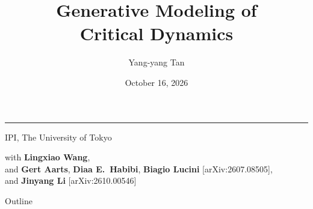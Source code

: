 \documentclass[11pt,t]{beamer}
\title{Generative Modeling of\\ Critical Dynamics}
\subtitle{}
\date{October 16, 2026}
\author{Yang-yang Tan}
\begin{document}
\begin{frame}
  \inserttitlegraphic\par
  \vspace*{0.5cm}
  {\LARGE\bfseries \inserttitle\par}
  \vspace{0.4em}
  {\color{orange}\rule{\textwidth}{0.4pt}\par}
  \vspace{1.4em}
  {\normalsize\bfseries \insertauthor\par}
  \vspace{0.6em}
  {\small IPI, The University of Tokyo\par}
  \vspace{0.4em}
  {\small with \textbf{Lingxiao Wang},\\
  and \textbf{Gert Aarts}, \textbf{Diaa E.\ Habibi}, \textbf{Biagio Lucini} [arXiv:2607.08505],\\
  and \textbf{Jinyang Li} [arXiv:2610.00546]\par}
  \vspace{0.3em}
  {\normalsize \insertdate\par}
\end{frame}

\begin{frame}{Outline}
  \tableofcontents
\end{frame}

\end{document}
